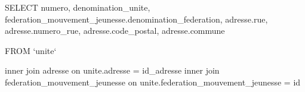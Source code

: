 

SELECT 
	numero, 
    denomination_unite,
    federation_mouvement_jeunesse.denomination_federation,
    adresse.rue, 
    adresse.numero_rue,
    adresse.code_postal,
    adresse.commune
    
FROM `unite` 

inner join adresse on unite.adresse = id_adresse
inner join federation_mouvement_jeunesse on unite.federation_mouvement_jeunesse = id